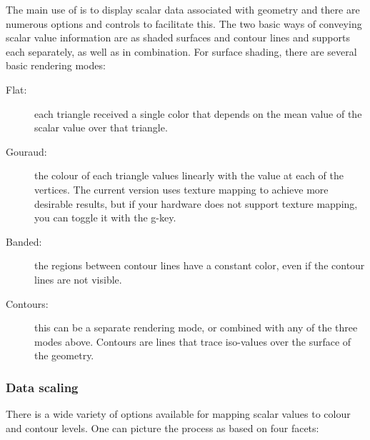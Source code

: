 The main use of \map{} is to display scalar data associated with geometry
and there are numerous options and controls to facilitate this.  The two
basic ways of conveying scalar value information are as shaded surfaces
and contour lines and \map{} supports each separately, as well as in
combination.  For surface shading, there are several basic rendering modes:

\begin{description}
  \item [Flat: ] each triangle received a single color that depends on the
        mean value of the scalar value over that triangle.
  \item [Gouraud: ] the colour of each triangle values linearly with the
        value at each of the vertices.  The current version uses texture
        mapping to achieve more desirable results, but if your hardware
        does not support texture mapping, you can toggle it with the g-key.
  \item [Banded: ] the regions between contour lines have a constant color,
        even if the contour lines are not visible.
  \item [Contours: ] this can be a separate rendering mode, or combined
        with any of the three modes above.  Contours are lines that trace
        iso-values over the surface of the geometry.
\end{description}


\subsubsection{Data scaling}
\label{sec:scaling} 

There is a wide variety of options available for mapping scalar values to
colour and contour levels.  One can picture the process as based on four
facets: 

